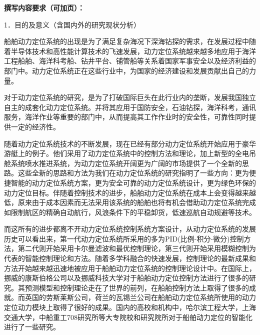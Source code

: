 \documentclass[a4paper,fontset=fandol]{ctexart}
\begin{document}
\begin{mdframed}
{\large \textbf{\fangsong 撰写内容要求（可加页）：}}

{\large \fangsong 
\begin{flushleft}
1．目的及意义（含国内外的研究现状分析）
\end{flushleft}

   船舶动力定位系统的出现是为了满足复杂海况下深海钻探的需求，在发展过程中随着半导体技术和高性能计算技术的飞速发展，动力定位系统越来越多地应用于海洋工程船舶、海洋科考船、钻井平台、铺管船等关系着国家军事安全以及经济利益的部门中。动力定位系统正在这些行业中，为国家的经济建设和发展贡献出自己的力量。
   
对于动力定位系统的研究，是为了打破国际巨头在此行业内的垄断，发展我国独立自主的成套化动力定位系统。并将其应用于国防安全，石油钻探，海洋科考，通讯服务，海洋作业等重要的部门中，从而提高其工作作业时的安全性，可靠性同时提供一定的经济性。

随着动力定位系统技术的不断发展，现在已经有部分动力定位系统开始应用于豪华游艇上的例子。他们采用了动力定位系统中的控制方法和理论，加上新型的全电吊舱系统喷水推进系统，为动力定位系统开阔更为广阔的市场提供了一个全新的思路。这些全新的思路和方法为我们在动力定位系统的研究指明了一些方向：更为便捷智能的动力定位系统方案，更为安全可靠的动力定位系统设计，更为绿色环保的动力定位目标。伴随着控制技术的进步，船舶动力定位系统在成本上会变得越来越低，原来由于成本因素而无法采用该系统的船舶也将有机会借助动力定位系统完成如限制航区的精确自动航行，风浪条件下的平稳卸货，低速巡航自动规避等技术。

而这所有的进步都离不开动力定位系统控制系统方案设计，从动力定位系统的发展历史可以看出来，第一代动力定位系统所采用的多为PID(比例-积分-微分)控制方法，第二代则开始采用卡尔曼滤波和最优控制理论，第三代则开始采用模糊控制为代表的智能控制理论和方法。随着多学科融合的快速发展，控制理论的最新成果和方法开始越来越迅速地被应用于船舶动力定位系统的控制理论设计中。在国际上，挪威的康斯伯格公司以及挪威科技大学对于船舶动力定位控制方法进行了很多的研究。其预测模型和控制理论走在了世界的前列，在船舶控制方法上取得了很多的成就。而英国的劳斯莱斯公司，荷兰的瓦锡兰公司在船舶动力定位系统所使用的动力定位动力模块上取得了很好的成果。国内的高校和机构中，哈尔滨工程大学，上海交通大学，中船重工708研究所等大专院校和研究院所对于船舶动力定位的智能化进行了一些研究。

}
\end{mdframed}
\end{document}
